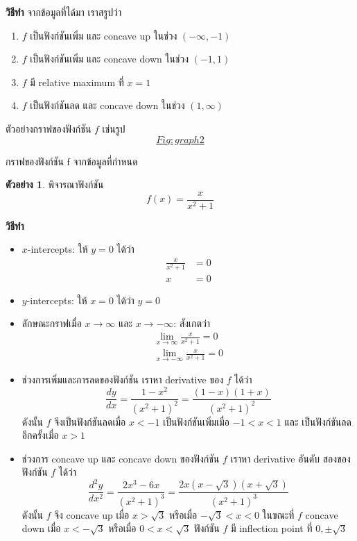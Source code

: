 \documentclass[
]{book}
\theoremstyle{definition}
\theoremstyle{definition}
\newtheorem{example}{ตัวอย่าง}[chapter]
\theoremstyle{definition}
\theoremstyle{definition}
\theoremstyle{remark}
\begin{document}
\textbf{วิธีทำ} จากข้อมูลที่ได้มา เราสรูปว่า

\begin{enumerate}
\def\labelenumi{\arabic{enumi}.}
\item
  \(f\) เป็นฟังก์ชันเพิ่ม และ concave up ในช่วง \((-\infty,-1)\)
\item
  \(f\) เป็นฟังก์ชันเพิ่ม และ concave down ในช่วง \((-1,1)\)
\item
  \(f\) มี relative maximum ที่ \(x=1\)
\item
  \(f\) เป็นฟังก์ชันลด และ concave down ในช่วง \((1,\infty)\)
\end{enumerate}

ตัวอย่างกราฟของฟังก์ชัน \(f\)
เช่นรูป~\hyperref[Fig:graph2]{\[Fig:graph2\]}

กราฟของฟังก์ชัน {f}
จากข้อมูลที่กำหนด

\begin{example}
พิจารณาฟังก์ชัน \[f(x) = \frac{x}{x^2+1}\]
\end{example}

\textbf{วิธีทำ}

\begin{itemize}
\item
  \(x\)-intercepts: ให้ \(y=0\) ได้ว่า \begin{equation}   \begin{aligned}
      \frac{x}{x^2+1} &= 0 \\
      x &= 0
    \end{aligned} \end{equation}
\item
  \(y\)-intercepts: ให้ \(x=0\) ได้ว่า \(y=0\)
\item
  ลักษณะกราฟเมื่อ \(x \to \infty\) และ \(x \to -\infty\): สังเกตว่า
  \begin{equation}   \begin{aligned}
      \lim_{x\to \infty} \frac{x}{x^2+1} = 0 \\
      \lim_{x\to -\infty} \frac{x}{x^2+1} = 0
    \end{aligned} \end{equation}
\item
  ช่วงการเพิ่มและการลดของฟังก์ชัน เราหา derivative ของ \(f\) ได้ว่า
  \[\frac{dy}{dx} = \frac{1-x^2}{(x^2+1)^2}  =\frac{(1-x)(1+x)}{(x^2+1)^2}\]
  ดังนั้น \(f\) จึงเป็นฟังก์ชันลดเมื่อ \(x < -1\) เป็นฟังก์ชันเพิ่มเมื่อ \(-1 < x < 1\) และ
  เป็นฟังก์ชันลดอีกครั้งเมื่อ \(x>1\)
\item
  ช่วงการ concave up และ concave down ของฟังก์ชัน \(f\) เราหา derivative
  อันดับ สองของฟังก์ชัน \(f\) ได้ว่า
  \[\frac{d^2y}{dx^2} = \frac{2x^3-6x}{(x^2+1)^3} = \frac{2x(x-\sqrt{3})(x+\sqrt{3})}{(x^2+1)^3}\]
  ดังนั้น \(f\) จึง concave up เมื่อ \(x>\sqrt{3}\) หรือเมื่อ \(-\sqrt{3}<x<0\)
  ในขณะที่ \(f\) concave down เมื่อ \(x<-\sqrt{3}\) หรือเมื่อ \(0<x<\sqrt{3}\)
  ฟังก์ชัน \(f\) มี inflection point ที่ \(0,\pm\sqrt{3}\)
\end{itemize}
\end{document}
